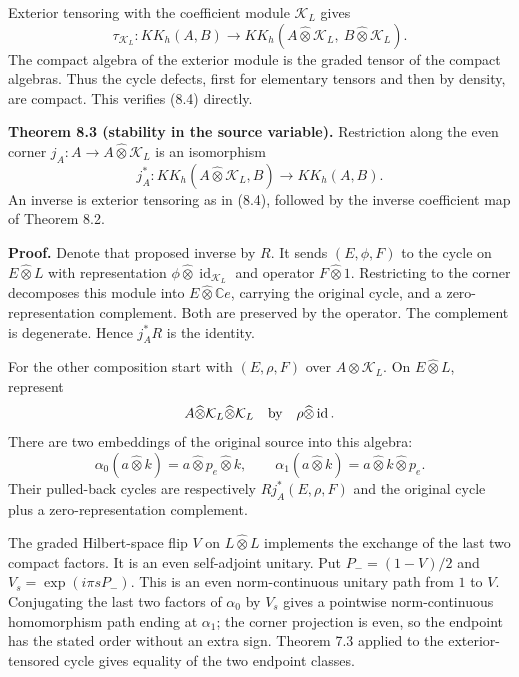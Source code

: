 \documentclass[
  11pt,
]{article}
\begin{document}
Exterior tensoring with the coefficient module \(\mathcal K_L\) gives \[
\tau_{\mathcal K_L}:KK_h(A,B)\longrightarrow
KK_h(A\widehat\otimes\mathcal K_L,\
B\widehat\otimes\mathcal K_L).
\tag{8.4}
\] The compact algebra of the exterior module is the graded tensor of
the compact algebras. Thus the cycle defects, first for elementary
tensors and then by density, are compact. This verifies (8.4) directly.

\textbf{Theorem 8.3 (stability in the source variable).} Restriction
along the even corner \(j_A:A\to A\widehat\otimes\mathcal K_L\) is an
isomorphism \[
j_A^*:KK_h(A\widehat\otimes\mathcal K_L,B)
\longrightarrow KK_h(A,B).
\tag{8.5}
\] An inverse is exterior tensoring as in (8.4), followed by the inverse
coefficient map of Theorem 8.2.

\textbf{Proof.} Denote that proposed inverse by \(R\). It sends
\((E,\phi,F)\) to the cycle on \(E\widehat\otimes L\) with
representation \(\phi\widehat\otimes\operatorname{id}_{\mathcal K_L}\)
and operator \(F\widehat\otimes1\). Restricting to the corner decomposes
this module into \(E\widehat\otimes\mathbb Ce\), carrying the original
cycle, and a zero-representation complement. Both are preserved by the
operator. The complement is degenerate. Hence \(j_A^*R\) is the
identity.

For the other composition start with \((E,\rho,F)\) over
\(A\widehat\otimes\mathcal K_L\). On \(E\widehat\otimes L\), represent
\[
A\widehat\otimes\mathcal K_L\widehat\otimes\mathcal K_L
\quad\hbox{by}\quad \rho\widehat\otimes\operatorname{id}.
\] There are two embeddings of the original source into this algebra: \[
\alpha_0(a\widehat\otimes k)=a\widehat\otimes p_e\widehat\otimes k,
\qquad
\alpha_1(a\widehat\otimes k)=a\widehat\otimes k\widehat\otimes p_e.
\tag{8.6}
\] Their pulled-back cycles are respectively \(Rj_A^*(E,\rho,F)\) and
the original cycle plus a zero-representation complement.

The graded Hilbert-space flip \(V\) on \(L\widehat\otimes L\) implements
the exchange of the last two compact factors. It is an even self-adjoint
unitary. Put \(P_-=(1-V)/2\) and \(V_s=\exp(i\pi sP_-)\). This is an
even norm-continuous unitary path from \(1\) to \(V\). Conjugating the
last two factors of \(\alpha_0\) by \(V_s\) gives a pointwise
norm-continuous homomorphism path ending at \(\alpha_1\); the corner
projection is even, so the endpoint has the stated order without an
extra sign. Theorem 7.3 applied to the exterior-tensored cycle gives
equality of the two endpoint classes.
\end{document}

